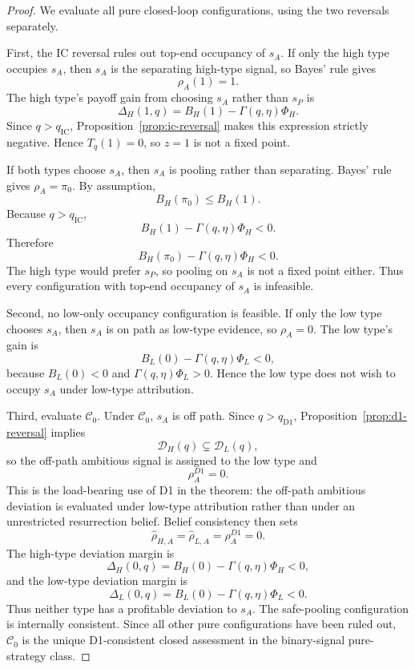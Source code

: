 \begin{proof}
We evaluate all pure closed-loop configurations, using the two reversals separately.

First, the IC reversal rules out top-end occupancy of \(s_A\). If only the high type occupies \(s_A\), then \(s_A\) is the separating high-type signal, so Bayes' rule gives
\[
\rho_A(1)=1.
\]
The high type's payoff gain from choosing \(s_A\) rather than \(s_P\) is
\[
\Delta_H(1,q)=B_H(1)-\Gamma(q,\eta)\Phi_H.
\]
Since \(q>q_{\mathrm{IC}}\), Proposition~\ref{prop:ic-reversal} makes this expression strictly negative. Hence \(T_q(1)=0\), so \(z=1\) is not a fixed point.

If both types choose \(s_A\), then \(s_A\) is pooling rather than separating. Bayes' rule gives \(\rho_A=\pi_0\). By assumption,
\[
B_H(\pi_0)\le B_H(1).
\]
Because \(q>q_{\mathrm{IC}}\),
\[
B_H(1)-\Gamma(q,\eta)\Phi_H<0.
\]
Therefore
\[
B_H(\pi_0)-\Gamma(q,\eta)\Phi_H<0.
\]
The high type would prefer \(s_P\), so pooling on \(s_A\) is not a fixed point either. Thus every configuration with top-end occupancy of \(s_A\) is infeasible.

Second, no low-only occupancy configuration is feasible. If only the low type chooses \(s_A\), then \(s_A\) is on path as low-type evidence, so \(\rho_A=0\). The low type's gain is
\[
B_L(0)-\Gamma(q,\eta)\Phi_L<0,
\]
because \(B_L(0)<0\) and \(\Gamma(q,\eta)\Phi_L>0\). Hence the low type does not wish to occupy \(s_A\) under low-type attribution.

Third, evaluate \(\mathcal C_0\). Under \(\mathcal C_0\), \(s_A\) is off path. Since \(q>q_{\mathrm{D1}}\), Proposition~\ref{prop:d1-reversal} implies
\[
\mathcal D_H(q)\subsetneq \mathcal D_L(q),
\]
so the off-path ambitious signal is assigned to the low type and
\[
\rho_A^{D1}=0.
\]
This is the load-bearing use of D1 in the theorem: the off-path ambitious deviation is evaluated under low-type attribution rather than under an unrestricted resurrection belief.
Belief consistency then sets
\[
\widehat\rho_{H,A}=\widehat\rho_{L,A}=\rho_A^{D1}=0.
\]
The high-type deviation margin is
\[
\Delta_H(0,q)=B_H(0)-\Gamma(q,\eta)\Phi_H<0,
\]
and the low-type deviation margin is
\[
\Delta_L(0,q)=B_L(0)-\Gamma(q,\eta)\Phi_L<0.
\]
Thus neither type has a profitable deviation to \(s_A\). The safe-pooling configuration is internally consistent. Since all other pure configurations have been ruled out, \(\mathcal C_0\) is the unique D1-consistent closed assessment in the binary-signal pure-strategy class.
\end{proof}

